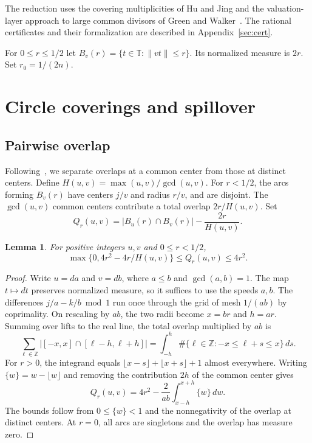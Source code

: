\documentclass[11pt,a4paper]{article}
\newtheorem{lemma}[theorem]{Lemma}
\begin{document}
The reduction uses the covering multiplicities of Hu and Jing and the
valuation-layer approach to large common divisors of Green and
Walker~\cite{GreenWalker}. The rational certificates and their
formalization are described in Appendix~\ref{sec:cert}.

For \(0\le r\le 1/2\) let \(B_v(r)=\{t\in\mathbb T:\|vt\|\le r\}\).
Its normalized measure is \(2r\). Set \(r_0=1/(2n)\).

\section{Circle coverings and spillover}

\subsection{Pairwise overlap}

Following~\cite{HuJing}, we separate overlaps at a common center from
those at distinct centers. Define \(H(u,v)=\max(u,v)/\gcd(u,v)\).
For \(r<1/2\), the arcs forming \(B_v(r)\) have centers \(j/v\) and
radius \(r/v\), and are disjoint. The \(\gcd(u,v)\) common centers
contribute a total overlap \(2r/H(u,v)\). Set
\[
 Q_r(u,v)=|B_u(r)\cap B_v(r)|-\frac{2r}{H(u,v)}.
\]

\begin{lemma}\label{lem:pair}
For positive integers \(u,v\) and \(0\le r<1/2\),
\[
 \max\{0,4r^2-4r/H(u,v)\}\le Q_r(u,v)\le4r^2.
\]
\end{lemma}

\begin{proof}
Write \(u=da\) and \(v=db\), where \(a\le b\) and \(\gcd(a,b)=1\).
The map \(t\mapsto dt\) preserves normalized measure, so it suffices to
use the speeds \(a,b\). The differences \(j/a-k/b\bmod 1\) run once
through the grid of mesh \(1/(ab)\) by coprimality. On rescaling by
\(ab\), the two radii become \(x=br\) and \(h=ar\). Summing over lifts
to the real line, the total overlap multiplied by \(ab\) is
\[
 \sum_{\ell\in\mathbb Z}|[-x,x]\cap[\ell-h,\ell+h]|
 =\int_{-h}^{h}\#\{\ell\in\mathbb Z:-x\le\ell+s\le x\}\,ds .
\]
For \(r>0\), the integrand equals
\(\lfloor x-s\rfloor+\lfloor x+s\rfloor+1\) almost everywhere.
Writing \(\{w\}=w-\lfloor w\rfloor\) and removing the contribution
\(2h\) of the common center gives
\[
 Q_r(u,v)=4r^2-\frac2{ab}\int_{x-h}^{x+h}\{w\}\,dw.
\]
The bounds follow from \(0\le\{w\}<1\) and the nonnegativity of the
overlap at distinct centers. At \(r=0\), all arcs are singletons and the overlap has measure zero.
\end{proof}
\end{document}
